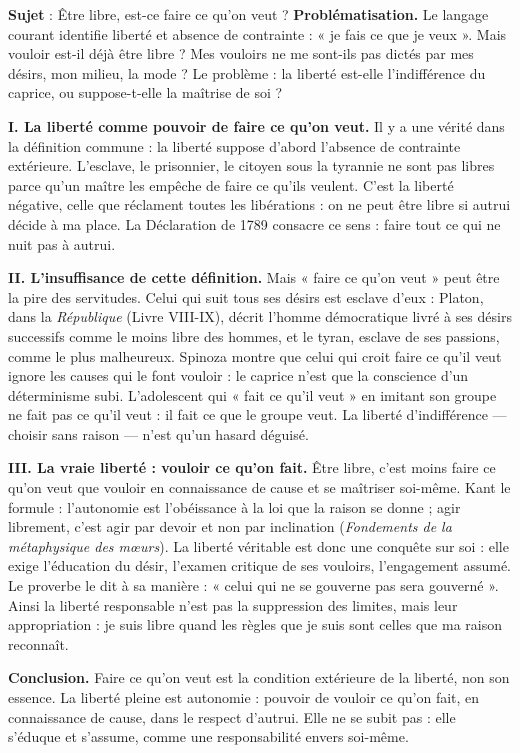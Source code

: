 \documentclass[11pt]{article}
\begin{document}
\begin{exoresolu}
\textbf{Sujet} : Être libre, est-ce faire ce qu'on veut ?
\tcblower
\textbf{Problématisation.} Le langage courant identifie liberté et absence de contrainte : « je fais ce que je veux ». Mais vouloir est-il déjà être libre ? Mes vouloirs ne me sont-ils pas dictés par mes désirs, mon milieu, la mode ? Le problème : la liberté est-elle l'indifférence du caprice, ou suppose-t-elle la maîtrise de soi ?

\textbf{I. La liberté comme pouvoir de faire ce qu'on veut.}
Il y a une vérité dans la définition commune : la liberté suppose d'abord l'absence de contrainte extérieure. L'esclave, le prisonnier, le citoyen sous la tyrannie ne sont pas libres parce qu'un maître les empêche de faire ce qu'ils veulent. C'est la liberté négative, celle que réclament toutes les libérations : on ne peut être libre si autrui décide à ma place. La Déclaration de 1789 consacre ce sens : faire tout ce qui ne nuit pas à autrui.

\textbf{II. L'insuffisance de cette définition.}
Mais « faire ce qu'on veut » peut être la pire des servitudes. Celui qui suit tous ses désirs est esclave d'eux : Platon, dans la \emph{République} (Livre VIII-IX), décrit l'homme démocratique livré à ses désirs successifs comme le moins libre des hommes, et le tyran, esclave de ses passions, comme le plus malheureux. Spinoza montre que celui qui croit faire ce qu'il veut ignore les causes qui le font vouloir : le caprice n'est que la conscience d'un déterminisme subi. L'adolescent qui « fait ce qu'il veut » en imitant son groupe ne fait pas ce qu'il veut : il fait ce que le groupe veut. La liberté d'indifférence — choisir sans raison — n'est qu'un hasard déguisé.

\textbf{III. La vraie liberté : vouloir ce qu'on fait.}
Être libre, c'est moins faire ce qu'on veut que vouloir en connaissance de cause et se maîtriser soi-même. Kant le formule : l'autonomie est l'obéissance à la loi que la raison se donne ; agir librement, c'est agir par devoir et non par inclination (\emph{Fondements de la métaphysique des mœurs}). La liberté véritable est donc une conquête sur soi : elle exige l'éducation du désir, l'examen critique de ses vouloirs, l'engagement assumé. Le proverbe le dit à sa manière : « celui qui ne se gouverne pas sera gouverné ». Ainsi la liberté responsable n'est pas la suppression des limites, mais leur appropriation : je suis libre quand les règles que je suis sont celles que ma raison reconnaît.

\textbf{Conclusion.} Faire ce qu'on veut est la condition extérieure de la liberté, non son essence. La liberté pleine est autonomie : pouvoir de vouloir ce qu'on fait, en connaissance de cause, dans le respect d'autrui. Elle ne se subit pas : elle s'éduque et s'assume, comme une responsabilité envers soi-même.
\end{exoresolu}
\end{document}
